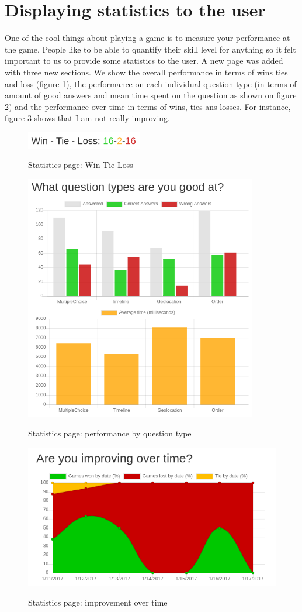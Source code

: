 \section{Displaying statistics to the user}
One of the cool things about playing a game is to measure your performance at the game. People like to be able to quantify their skill level for anything so it felt important to us to provide some statistics to the user. A new page was added with three new sections. We show the overall performance in terms of wins ties and loss (figure \ref{fig:statsWTL}), the performance on each individual question type (in terms of amount of good answers and mean time spent on the question as shown on figure \ref{fig:statsQP}) and the performance over time in terms of wins, ties ans losses. For instance, figure \ref{fig:statsTI} shows that I am not really improving.
\begin{figure}
\centering
{\includegraphics[width=2in]{images/wtl.png}}
\caption{Statistics page: Win-Tie-Loss}
\label{fig:statsWTL}
\end{figure}
\begin{figure}
\centering
{\includegraphics[width=4in]{images/questions_perf.png}}
\caption{Statistics page: performance by question type}
\label{fig:statsQP}
\end{figure}
\begin{figure}
\centering
{\includegraphics[width=4.5in]{images/time_improv.png}}
\caption{Statistics page: improvement over time}
\label{fig:statsTI}
\end{figure}
